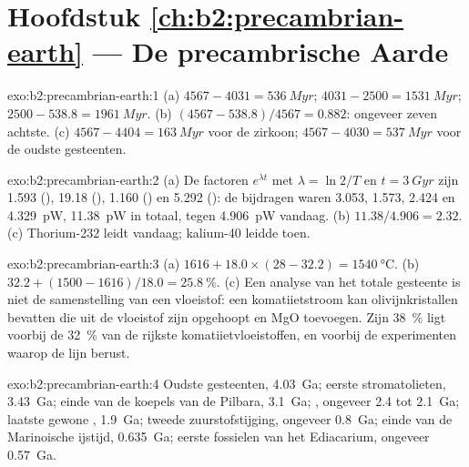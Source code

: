 \section*{Hoofdstuk \ref{ch:b2:precambrian-earth} --- De precambrische Aarde}

\begin{solution}{exo:b2:precambrian-earth:1}
(a)  $4567 - 4031 = \qty{536}{Myr}$;  $4031 - 2500 = \qty{1531}{Myr}$;
 $2500 - 538.8 = \qty{1961}{Myr}$. (b) $(4567 - 538.8)/4567 = 0.882$: ongeveer zeven
achtste. (c) $4567 - 4404 = \qty{163}{Myr}$ voor de zirkoon; $4567 - 4030 = \qty{537}{Myr}$ voor
de oudste gesteenten.
\end{solution}

\begin{solution}{exo:b2:precambrian-earth:2}
(a) De factoren $e^{\lambda t}$ met $\lambda = \ln2/T$ en $t = \qty{3}{Gyr}$ zijn 1.593
(), 19.18 (), 1.160 () en 5.292 (): de
bijdragen waren 3.053, 1.573, 2.424 en \qty{4.329}{pW}, \qty{11.38}{pW} in totaal, tegen
\qty{4.906}{pW} vandaag. (b) $11.38/4.906 = 2.32$. (c) Thorium-232 leidt vandaag; kalium-40 leidde
toen.
\end{solution}

\begin{solution}{exo:b2:precambrian-earth:3}
(a) $1616 + 18.0\times(28 - 32.2) = \qty{1540}{\celsius}$. (b) $32.2 + (1500 - 1616)/18.0 =
\qty{25.8}{\percent}$. (c) Een analyse van het totale gesteente is niet de samenstelling van een vloeistof: een
komatiietstroom kan olivijnkristallen bevatten die uit de vloeistof zijn opgehoopt en MgO toevoegen. Zijn
\qty{38}{\percent} ligt voorbij de \qty{32}{\percent} van de rijkste komatiietvloeistoffen, en
voorbij de experimenten waarop de lijn berust.
\end{solution}

\begin{solution}{exo:b2:precambrian-earth:4}
Oudste gesteenten, \qty{4.03}{Ga}; eerste stromatolieten, \qty{3.43}{Ga}; einde van de koepels van de Pilbara,
\qty{3.1}{Ga}; , ongeveer 2.4 tot \qty{2.1}{Ga}; laatste gewone ,
\qty{1.9}{Ga}; tweede zuurstofstijging, ongeveer \qty{0.8}{Ga}; einde van de Marinoische ijstijd,
\qty{0.635}{Ga}; eerste fossielen van het Ediacarium, ongeveer \qty{0.57}{Ga}.
\end{solution}

